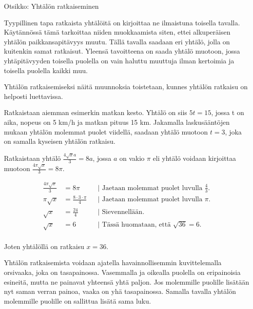 
Otsikko: Yhtälön ratkaiseminen

Tyypillinen tapa ratkaista yhtälöitä on kirjoittaa ne ilmaistuna toisella tavalla.
Käytännössä tämä tarkoittaa niiden muokkaamista siten, ettei alkuperäisen yhtälön paikkansapitävyys muutu. Tällä tavalla saadaan eri yhtälö, jolla on kuitenkin samat ratkaisut. Yleensä tavoitteena on saada yhtälö muotoon, jossa yhtäpitävyyden toisella puolella on vain haluttu muuttuja ilman kertoimia ja toisella puolella kaikki muu. 

Yhtälön ratkaisemiseksi näitä muunnoksia toistetaan, kunnes yhtälön ratkaisu on helposti luettavissa.

\begin{esimerkki}
Ratkaistaan aiemman esimerkin matkan kesto. Yhtälö on siis $5t=15$, jossa t on aika, nopeus on 5 km/h ja matkan pituus 15 km. 
Jakamalla laskusääntöjen mukaan yhtälön molemmat puolet viidellä, saadaan yhtälö muotoon $t=3$, joka on samalla kyseisen yhtälön ratkaisu.
\end{esimerkki}


\begin{esimerkki}
Ratkaistaan yhtälö $\frac{4\sqrt{x}a}{3}=8a$, jossa $a$ on vakio $\pi$ eli yhtälö voidaan kirjoittaa muotoon $\frac{4\pi\sqrt{x}}{3}=8\pi$.

		\begin{align*}
			\frac{4 \pi \sqrt{x}}{3} &= 8 {\pi} && \text{| Jaetaan molemmat puolet luvulla $\frac{4}{3}$.} \\
			{\pi}\sqrt{x} &= \frac{8\cdot 3\cdot {\pi}}{4} && \text{| Jaetaan molemmat puolet luvulla $\pi$.} \\
			\sqrt{x} &= \frac{24}{4} && \text{| Sievennellään.} \\
			\sqrt{x} &= 6 && \text{| Tässä huomataan, että $\sqrt{36}=6$.} \\
\end{align*}

Joten yhtälöllä on ratkaisu $x=36$.

\end{esimerkki}

Yhtälön ratkaisemista voidaan ajatella havainnollisemmin kuvittelemalla orsivaaka, joka on tasapainossa.
Vasemmalla ja oikealla puolella on eripainoisia esineitä, mutta ne painavat yhteensä yhtä paljon. 
Jos molemmille puolille lisätään nyt saman verran painoa, vaaka on yhä tasapainossa. Samalla tavalla yhtälön molemmille 
puolille on sallittua lisätä sama luku.

